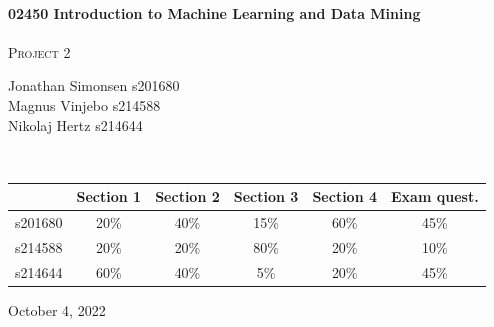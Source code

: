 \begin{titlepage}
	
	
	\HRule\\[0.5cm]
	
	{\huge\bfseries 02450  Introduction to Machine Learning and Data Mining}\\[0.4cm] %

	\HRule\\[0.5cm]
	
	\textsc{\Large Project 2}\\[1cm] %
	
    \begin{minipage}{0.5\textwidth}
		\begin{flushleft}
            \centering
            Jonathan Simonsen s201680 \\
            Magnus Vinjebo s214588   \\
            Nikolaj Hertz s214644  \\
            
		\end{flushleft}
	\end{minipage} 
    \\[1cm]
    \vfill 

\begin{table}[h!]
\centering
\begin{tabular}{|l|c|c|c|c|c|}
\hline
 & Section 1 & Section 2 & Section 3 & Section 4 & Exam quest. \\ \hline
s201680 & 20\% & 40\% & 15\% & 60\% & 45\% \\ \hline 
s214588 & 20\% & 20\% & 80\% & 20\% & 10\% \\ \hline 
s214644 & 60\% & 40\% & 5\% & 20\% & 45\% \\ \hline 
\end{tabular}
\end{table}
    


	
	\vfill\vfill\vfill %
	
	{\large October 4, 2022} %
	
	\vfill %
	
\end{titlepage}